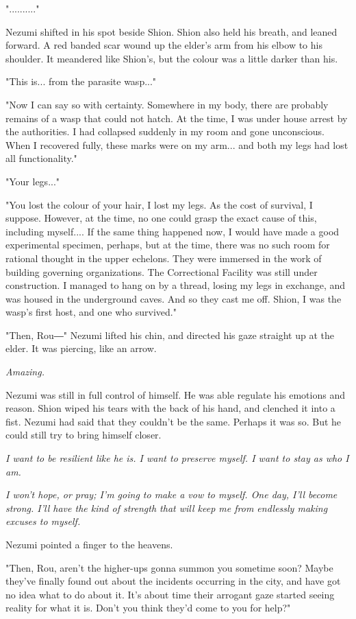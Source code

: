 ".........."

Nezumi shifted in his spot beside Shion. Shion also held his breath, and
leaned forward. A red banded scar wound up the elder's arm from his
elbow to his shoulder. It meandered like Shion's, but the colour was a
little darker than his.

"This is... from the parasite wasp..."

"Now I can say so with certainty. Somewhere in my body, there are
probably remains of a wasp that could not hatch. At the time, I was
under house arrest by the authorities. I had collapsed suddenly in my
room and gone unconscious. When I recovered fully, these marks were on
my arm... and both my legs had lost all functionality."

"Your legs..."

"You lost the colour of your hair, I lost my legs. As the cost of
survival, I suppose. However, at the time, no one could grasp the exact
cause of this, including myself.... If the same thing happened now, I
would have made a good experimental specimen, perhaps, but at the time,
there was no such room for rational thought in the upper echelons. They
were immersed in the work of building governing organizations. The
Correctional Facility was still under construction. I managed to hang on
by a thread, losing my legs in exchange, and was housed in the
underground caves. And so they cast me off. Shion, I was the wasp's
first host, and one who survived."

"Then, Rou―" Nezumi lifted his chin, and directed his gaze straight up
at the elder. It was piercing, like an arrow.

\emph{Amazing.}

Nezumi was still in full control of himself. He was able regulate his
emotions and reason. Shion wiped his tears with the back of his hand,
and clenched it into a fist. Nezumi had said that they couldn't be the
same. Perhaps it was so. But he could still try to bring himself closer.

\emph{I want to be resilient like he is. I want to preserve myself. I want to
stay as who I am.}

\emph{I won't hope, or pray; I'm going to make a vow to myself. One day, I'll
become strong. I'll have the kind of strength that will keep me from
endlessly making excuses to myself.}

Nezumi pointed a finger to the heavens.

"Then, Rou, aren't the higher-ups gonna summon you sometime soon? Maybe
they've finally found out about the incidents occurring in the city, and
have got no idea what to do about it. It's about time their arrogant
gaze started seeing reality for what it is. Don't you think they'd come
to you for help?"


